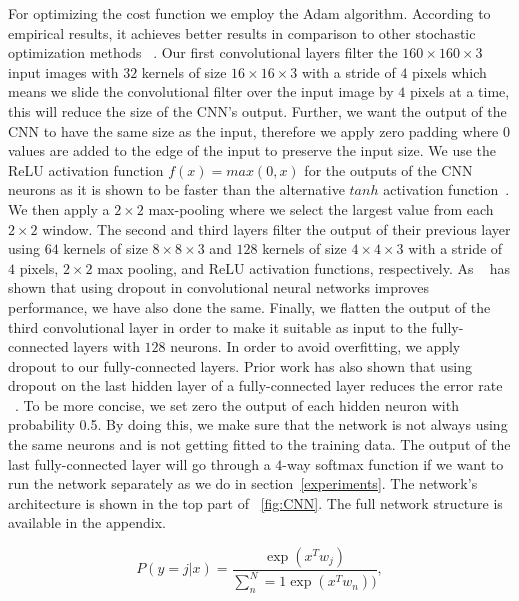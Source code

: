 \documentclass{article} %
\begin{document}
For optimizing the cost function we employ the Adam algorithm. According to empirical results, it achieves better results in comparison to other stochastic optimization methods ~\cite{adam}. Our first convolutional layers filter the $160\times160\times3$ input images with $32$ kernels of size $16\times16\times3$ with a stride of $4$ pixels which means we slide the convolutional filter over the input image by $4$ pixels at a time, this will reduce the size of the CNN's output. Further, we want the output of the CNN to have the same size as the input, therefore we apply zero padding where $0$ values are added to the edge of the input to preserve the input size. We use the ReLU activation function $f(x) = max(0,x)$ for the outputs of the CNN neurons as it is shown to be faster than the alternative $tanh$ activation function~\cite{imagehinton}. We then apply a $2\times2$ max-pooling where we select the largest value from each $2\times2$ window. 
The second and third layers filter the output of their previous layer using $64$ kernels of size $8\times8\times3$ and $128$ kernels of size $4\times4\times3$ with a stride of $4$ pixels, $2\times2$ max pooling, and ReLU activation functions, respectively. As ~\cite{CNNdropout2} has shown that using dropout in convolutional neural networks improves performance, we have also done the same.
Finally, we flatten the output of the third convolutional layer in order to make it suitable as input to the fully-connected layers with $128$ neurons. In order to avoid overfitting, we apply dropout to our fully-connected layers. Prior work has also shown that using dropout on the last hidden layer of a fully-connected layer reduces the error rate ~\cite{CNNdropout}. To be more concise, we set zero the output of each hidden neuron with probability 0.5. By doing this, we make sure that the network is not always using the same neurons and is not getting fitted to the training data. The output of the last fully-connected layer will go through a $4$-way softmax function if we want to run the network separately as we do in section~\ref{experiments}. The network's architecture is shown in the top part of 
~\ref{fig:CNN}. The full network structure is available in the appendix.

\begin{equation}
  \label{softmax}
  P(y=j | x) = \frac{\exp(x^T w_j)}{\sum^{N}_n=1 \exp(x^T w_n))},
\end{equation}
\end{document}
